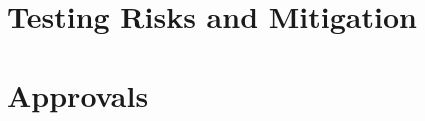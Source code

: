 \documentclass[english,12pt]{article}
\begin{document}
\section{Testing Risks and Mitigation}

\section{Approvals}
\end{document}
